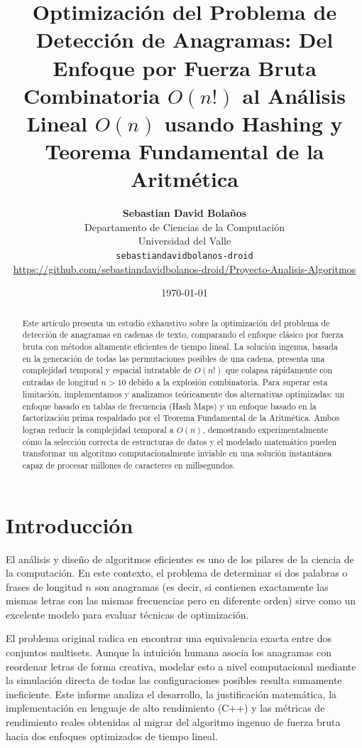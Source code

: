 \documentclass[twocolumn]{article}
\title{\textbf{Optimización del Problema de Detección de Anagramas: Del Enfoque por Fuerza Bruta Combinatoria $O(n!)$ al Análisis Lineal $O(n)$ usando Hashing y Teorema Fundamental de la Aritmética}}
\author{\textbf{Sebastian David Bolaños} \\
Departamento de Ciencias de la Computación \\
Universidad del Valle \\
\texttt{sebastiandavidbolanos-droid} \\
\url{https://github.com/sebastiandavidbolanos-droid/Proyecto-Analisis-Algoritmos}}
\date{\today}
\begin{document}
\maketitle

\begin{abstract}
Este artículo presenta un estudio exhaustivo sobre la optimización del problema de detección de anagramas en cadenas de texto, comparando el enfoque clásico por fuerza bruta con métodos altamente eficientes de tiempo lineal. La solución ingenua, basada en la generación de todas las permutaciones posibles de una cadena, presenta una complejidad temporal y espacial intratable de $O(n!)$ que colapsa rápidamente con entradas de longitud $n > 10$ debido a la explosión combinatoria. Para superar esta limitación, implementamos y analizamos teóricamente dos alternativas optimizadas: un enfoque basado en tablas de frecuencia (Hash Maps) y un enfoque basado en la factorización prima respaldado por el Teorema Fundamental de la Aritmética. Ambos logran reducir la complejidad temporal a $O(n)$, demostrando experimentalmente cómo la selección correcta de estructuras de datos y el modelado matemático pueden transformar un algoritmo computacionalmente inviable en una solución instantánea capaz de procesar millones de caracteres en milisegundos.
\end{abstract}

\section{Introducción}
El análisis y diseño de algoritmos eficientes es uno de los pilares de la ciencia de la computación. En este contexto, el problema de determinar si dos palabras o frases de longitud $n$ son anagramas (es decir, si contienen exactamente las mismas letras con las mismas frecuencias pero en diferente orden) sirve como un excelente modelo para evaluar técnicas de optimización.

El problema original radica en encontrar una equivalencia exacta entre dos conjuntos multisets. Aunque la intuición humana asocia los anagramas con reordenar letras de forma creativa, modelar esto a nivel computacional mediante la simulación directa de todas las configuraciones posibles resulta sumamente ineficiente. Este informe analiza el desarrollo, la justificación matemática, la implementación en lenguaje de alto rendimiento (C++) y las métricas de rendimiento reales obtenidas al migrar del algoritmo ingenuo de fuerza bruta hacia dos enfoques optimizados de tiempo lineal.
\end{document}
